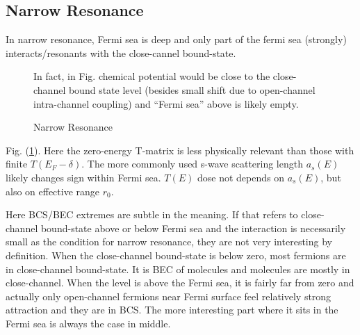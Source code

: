 \documentclass{article}
\begin{document}
\subsection{Narrow Resonance}
In narrow resonance, Fermi sea is deep and only part of the fermi sea (strongly) interacts/resonants with the close-cannel bound-state.   
\begin{figure}[hhtb]
	\centering
	         \quad
		\quad
	{\caption{Narrow Resonance\label{fig:narrowFR}}
	\parbox{0.7\textwidth}{\small{In fact, in Fig.  chemical potential would be close to the close-channel bound state level (besides small shift due to open-channel intra-channel coupling) and ``Fermi sea'' above is likely empty. }}}
\end{figure}
Fig. (\ref{fig:narrowFR}).  Here the zero-energy T-matrix is less  physically relevant than those with finite $T(E_{F}-\delta)$.  The more commonly used s-wave scattering length $a_{s}(E)$ likely changes sign within Fermi sea.  $T(E)$ dose not depends on $a_{s}(E)$, but also on effective range $r_{0}$.  

Here BCS/BEC extremes are subtle in the meaning.  If that refers to close-channel bound-state above or below Fermi sea and the interaction is necessarily small as the condition for narrow resonance, they are not very interesting by definition.  When the close-channel bound-state is below zero, most fermions are in close-channel bound-state.  It is BEC of molecules and molecules are mostly in close-channel. When the level is above the Fermi sea, it is fairly far from zero and actually only open-channel fermions near Fermi surface feel relatively strong attraction and they are in BCS.  The more interesting part where it sits in the Fermi sea is always the  case in middle.  
\end{document}
